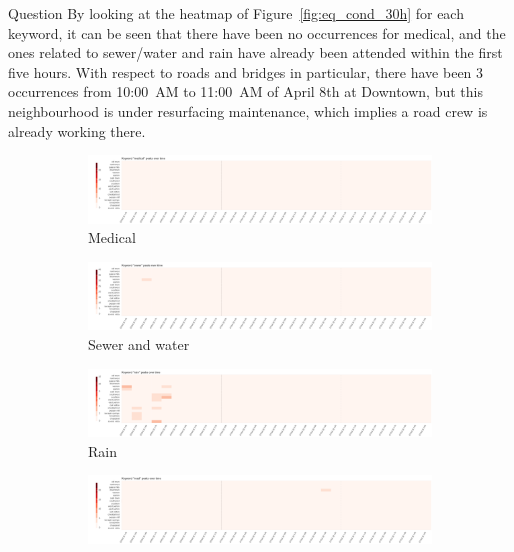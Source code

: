 \begin{section}{Question}
By looking at the heatmap of Figure~\ref{fig:eq_cond_30h} for each keyword, it
can be seen that there have been no occurrences for medical, and the ones
related to sewer/water and rain have already been attended within the first five
hours. With respect to roads and bridges in particular, there have been 3
occurrences from 10:00~AM to 11:00~AM of April 8th at Downtown, but this
neighbourhood is under resurfacing maintenance, which implies a road crew is
already working there.

\begin{figure}[!h]
    \centering
    \begin{subfigure}[!h]{0.48\textwidth}
        \centering
        \includegraphics[width=1.00\textwidth]{figs/cond_30h/cond_30h_medical.png}
        \caption{Medical}
        \label{fig:medical_30h}
    \end{subfigure}
    \begin{subfigure}[!h]{0.48\textwidth}
        \centering
        \includegraphics[width=1.00\textwidth]{figs/cond_30h/cond_30h_sewer.png}
        \caption{Sewer and water}
        \label{fig:sewer_30h}
    \end{subfigure}
    \begin{subfigure}[!h]{0.48\textwidth}
        \centering
        \includegraphics[width=1.00\textwidth]{figs/cond_30h/cond_30h_rain.png}
        \caption{Rain}
        \label{fig:rain_30h}
    \end{subfigure}
    \begin{subfigure}[!h]{0.48\textwidth}
        \centering
        \includegraphics[width=1.00\textwidth]{figs/cond_30h/cond_30h_road.png}

\end{subfigure}
\end{figure}
\end{section}
